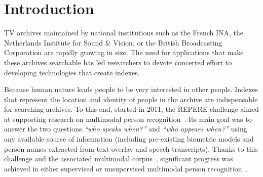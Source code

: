 \section{Introduction}

TV archives maintained by national institutions such as the French INA, the Netherlands Institute for Sound \& Vision, or the British Broadcasting Corporation are rapidly growing in size. The need for applications that make these archives searchable has led researchers to devote concerted effort to developing technologies that create indexes.

Because human nature leads people to be very interested in other people.
Indexes that represent the location and identity of people in the archive are indispensable for searching archives.
%
To this end, started in 2011, the REPERE challenge aimed at supporting research on multimodal person recognition~\cite{BERNARD--SLAM--2013, KAHN--CBMI--2012}. Its main goal was to answer the two questions \emph{``who speaks when?''} and \emph{``who appears when?''} using any available source of information (including pre-existing biometric models and person names extracted from text overlay and speech transcripts). 
%
Thanks to this challenge and the associated multimodal corpus~\cite{GIRAUDEL--LREC--2012}, significant progress was achieved in either supervised or unsupervised multimodal person recognition~\cite{BECHET--INTERSPEECH--2014, BREDIN--ODYSSEY--2014, BREDIN--IJMIR--2014, GAY--CBMI--2014, POIGNANT--ASLP--2015, POIGNANT--INTERSPEECH--2012, POIGNANT--MTAP--2015, ROUVIER--CBMI--2014}.

